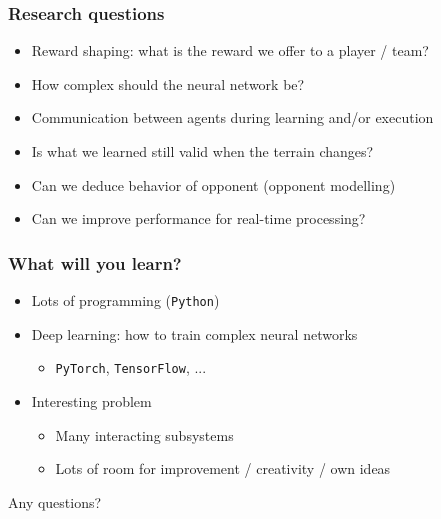 \documentclass{beamer}
\begin{document}
\begin{frame}
\frametitle{Research questions}
\begin{itemize}
   \item Reward shaping: what is the reward we offer to a player / team?
    \item How complex should the neural network be?
    \item Communication between agents during learning and/or execution
    \item Is what we learned still valid when the terrain changes?
    \item Can we deduce behavior of opponent (opponent modelling)
    \item Can we improve performance for real-time processing?
\end{itemize}
\end{frame}

\begin{frame}
\frametitle{What will you learn?}
\begin{itemize}
    \item Lots of programming ({\tt Python})
    \item Deep learning: how to train complex neural networks
    \begin{itemize}
        \item {\tt PyTorch}, {\tt TensorFlow}, ...
    \end{itemize}
    \item Interesting problem
        \begin{itemize}
            \item Many interacting subsystems
            \item Lots of room for improvement / creativity / own ideas
        \end{itemize} 
\end{itemize}
\end{frame}

\begin{frame}%

\begin{center}
\Huge Any questions?
\end{center}

\end{frame}
\end{document}
